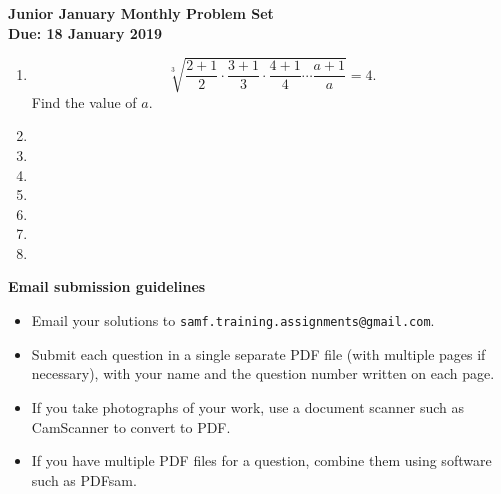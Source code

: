 \documentclass{article}
\begin{document}
\begin{center}
\textbf{\Large Junior January Monthly Problem Set}
\\ \vspace{1em}
\textbf{\large Due: 18 January 2019}
\end{center}

\begin{enumerate}[1.]

\vspace{6pt}
\item %
\[ \sqrt[3]{\frac{2+1}{2}\cdot\frac{3+1}{3}\cdot\frac{4+1}{4}\dotsm\frac{a+1}{a}} = 4. \]
Find the value of $a$.


\vspace{6pt}
\item 


\vspace{6pt}
\item 


\vspace{6pt}
\item 


\vspace{6pt}
\item 


\vspace{6pt}
\item


\vspace{6pt}
\item


\vspace{6pt}
\item %


\end{enumerate}


\vfill
\textbf{\Large Email submission guidelines}
\begin{itemize}
	\item Email your solutions to \verb!samf.training.assignments@gmail.com!.
	\item Submit each question in a single separate PDF file (with multiple pages if necessary), with your name and the question number written on each page.
	\item If you take photographs of your work, use a document scanner such as CamScanner to convert to PDF.
	\item If you have multiple PDF files for a question, combine them using software such as PDFsam.
\end{itemize}
\end{document}
